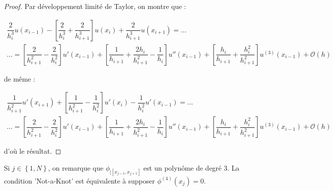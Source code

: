 \begin{proof}
Par développement limité de Taylor, on montre que :

\begin{multline}
\dfrac{2}{h_i^3} u(x_{i-1}) - \left[ \dfrac{2}{h_i^3} + \dfrac{2}{h_{i+1}^3} \right] u(x_i) + \dfrac{2}{h_{i+1}^3} u(x_{i+1}) = ... \\ 
...=\left[ \dfrac{2}{h_{i+1}^2} - \dfrac{2}{h_i^2}  \right] u'(x_{i-1}) +\left[ \dfrac{1}{h_{i+1}} + \dfrac{2 h_i}{h_{i+1}^2} - \dfrac{1}{h_i} \right] u''(x_{i-1}) + \left[ \dfrac{h_i}{h_{i+1}} + \dfrac{h_i^2}{h_{i+1}^2} \right] u^{(3)}(x_{i-1}) + \mathcal{O}(h)
\end{multline}

de même :

\begin{multline}
\dfrac{1}{h_{i+1}^2} u'(x_{i+1}) + \left[ \dfrac{1}{h_{i+1}^2} - \dfrac{1}{h_i^2} \right] u'(x_i) - \dfrac{1}{h_i^2} u'(x_{i-1}) = ... \\ 
...=\left[ \dfrac{2}{h_{i+1}^2} - \dfrac{2}{h_i^2}  \right] u'(x_{i-1}) +\left[ \dfrac{1}{h_{i+1}} + \dfrac{2 h_i}{h_{i+1}^2} - \dfrac{1}{h_i} \right] u''(x_{i-1}) + \left[ \dfrac{h_i}{h_{i+1}} + \dfrac{h_i^2}{h_{i+1}^2} \right] u^{(3)}(x_{i-1}) + \mathcal{O}(h)
\end{multline}

d'où le résultat.
\end{proof}

\begin{remarque}
Si $j \in \left\lbrace 1, N \right\rbrace $, on remarque que $\phi_{|[x_{j-1}, x_{j+1}]}$ est un polynôme de degré 3. La condition 'Not-a-Knot' est équivalente à supposer $\phi^{(4)} (x_j) =0$.
\end{remarque}












